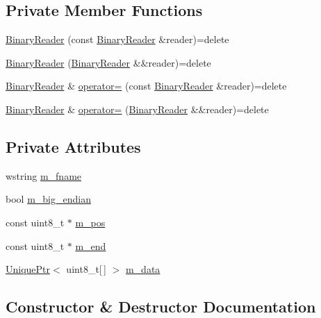 \subsection*{Private Member Functions}
\begin{DoxyCompactItemize}
\item 
\hyperlink{classmage_1_1_binary_reader_a8c1ff948f1d056439f3d8cc37d7f507c}{Binary\+Reader} (const \hyperlink{classmage_1_1_binary_reader}{Binary\+Reader} \&reader)=delete
\item 
\hyperlink{classmage_1_1_binary_reader_ac8f3141f7ce5da9cd1890b4a61edf0a3}{Binary\+Reader} (\hyperlink{classmage_1_1_binary_reader}{Binary\+Reader} \&\&reader)=delete
\item 
\hyperlink{classmage_1_1_binary_reader}{Binary\+Reader} \& \hyperlink{classmage_1_1_binary_reader_a0408bb456983b4a03ae42ab69c6f4bc3}{operator=} (const \hyperlink{classmage_1_1_binary_reader}{Binary\+Reader} \&reader)=delete
\item 
\hyperlink{classmage_1_1_binary_reader}{Binary\+Reader} \& \hyperlink{classmage_1_1_binary_reader_abb971fe92727a0e86b3698dba8c586de}{operator=} (\hyperlink{classmage_1_1_binary_reader}{Binary\+Reader} \&\&reader)=delete
\end{DoxyCompactItemize}
\subsection*{Private Attributes}
\begin{DoxyCompactItemize}
\item 
wstring \hyperlink{classmage_1_1_binary_reader_a9c97c02d53ce60a9952751ad4f55414f}{m\+\_\+fname}
\item 
bool \hyperlink{classmage_1_1_binary_reader_a8d23fde958e08efe248edb5d92861113}{m\+\_\+big\+\_\+endian}
\item 
const uint8\+\_\+t $\ast$ \hyperlink{classmage_1_1_binary_reader_a086c8b8615dddb15a97acf657bb4d73b}{m\+\_\+pos}
\item 
const uint8\+\_\+t $\ast$ \hyperlink{classmage_1_1_binary_reader_a929b6480629014c24263ec3042b1f364}{m\+\_\+end}
\item 
\hyperlink{namespacemage_a8c307fbcc33bce9b7f2aa4c26c3b95cf}{Unique\+Ptr}$<$ uint8\+\_\+t\mbox{[}$\,$\mbox{]} $>$ \hyperlink{classmage_1_1_binary_reader_a34820a214a5b98e09beb12e8a465b0e3}{m\+\_\+data}
\end{DoxyCompactItemize}


\subsection{Constructor \& Destructor Documentation}
\hypertarget{classmage_1_1_binary_reader_aa300382cfa1585bb2f76c4e764bb5617}{}\label{classmage_1_1_binary_reader_aa300382cfa1585bb2f76c4e764bb5617} 
